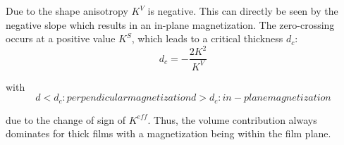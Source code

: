 \documentclass[12pt]{article} %
\begin{document}
Due to the shape anisotropy $K^V$ is negative. This can directly be seen by the negative slope which results in an in-plane magnetization. The zero-crossing occurs at a positive value $K^S$, which leads to a critical thickness $d_c$:
\begin{equation}
d_c = -\frac{2K^2}{K^V}
\end{equation}

with
\begin{equation}
d < d_c : perpendicular magnetization
d > d_c : in-plane magnetization
\end{equation}

due to the change of sign of $K^{eff}$. Thus, the volume contribution always dominates for thick films with a magnetization being within the film plane. 
\end{document}
